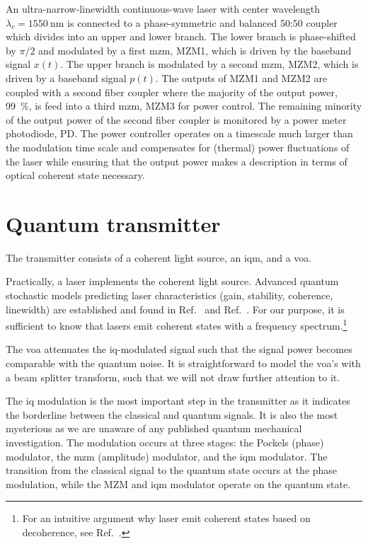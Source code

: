 An ultra-narrow-linewidth continuous-wave laser with center wavelength $\lambda_c=\SI{1550}{\nano\meter}$ is connected to a phase-symmetric and balanced 50:50 coupler which divides into an upper and lower branch.
The lower branch is phase-shifted by $\pi/2$ and modulated by a first \gls{mzm}, MZM1, which is driven by the baseband signal $x(t)$.
The upper branch is modulated by a second \gls{mzm}, MZM2, which is driven by a baseband signal $p(t)$.
The outputs of MZM1 and MZM2 are coupled with a second fiber coupler where the majority of the output power, \SI{99}{\percent}, is feed into a third \gls{mzm}, MZM3 for power control.
The remaining minority of the output power of the second fiber coupler is monitored by a power meter photodiode, PD.
The power controller operates on a timescale much larger than the modulation time scale and compensates for (thermal) power fluctuations of the laser while ensuring that the output power makes a description in terms of optical coherent state necessary.


\section{Quantum transmitter}

The transmitter consists of a coherent light source, an \gls{iqm}, and a \gls{voa}.

Practically, a laser implements the coherent light source.
Advanced quantum stochastic models predicting laser characteristics (gain, stability, coherence, linewidth) are established and found in  Ref.~\cite[p.~900]{Mandel1995} and Ref.~\cite{Haken2012}.
For our purpose, it is sufficient to know that lasers emit coherent states with a frequency spectrum.\footnote{For an intuitive argument why laser emit coherent states based on decoherence, see Ref.~\cite{Gea1998}.}

The \gls{voa} attenuates the \gls{iq}-modulated signal such that the signal power becomes comparable with the quantum noise.
It is straightforward to model the \gls{voa}'s with a beam splitter transform, such that we will not draw further attention to it.

The \gls{iq} modulation is the most important step in the transmitter as it indicates the borderline between the classical and quantum signals.
It is also the most mysterious as we are unaware of any published quantum mechanical investigation.
The modulation occurs at three stages: the Pockels (phase) modulator, the \gls{mzm} (amplitude) modulator, and the \gls{iqm} modulator.
The transition from the classical signal to the quantum state occurs at the phase modulation, while the MZM and \gls{iqm} modulator operate on the quantum state.

